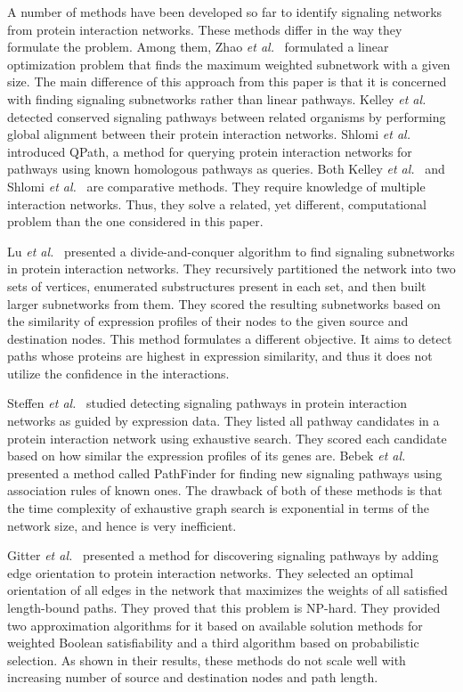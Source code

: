 \documentclass{ws-procs11x85}
\begin{document}
{%

A number of methods have been developed so far to identify signaling
networks from protein interaction networks. These methods differ in
the way they formulate the problem. Among them, Zhao {\it et
  al.}~\cite{zhao} formulated a linear optimization problem that finds
the maximum weighted subnetwork with a given size. The main difference
of this approach from this paper is that it is concerned with finding
signaling subnetworks rather than linear pathways.  Kelley {\it et
  al.}~\cite{kelley} detected conserved signaling pathways between
related organisms by performing global alignment between their protein
interaction networks.  Shlomi {\it et al.}~\cite{shlomi} introduced
QPath, a method for querying protein interaction networks for pathways
using known homologous pathways as queries.  Both Kelley {\it et
  al.}~\cite{kelley} and Shlomi {\it et al.}~\cite{shlomi} are
comparative methods.  They require knowledge of multiple interaction
networks. Thus, they solve a related, yet different, computational
problem than the one considered in this paper.

Lu {\it et al.}~\cite{lu} presented a divide-and-conquer algorithm to
find signaling subnetworks in protein interaction networks. They
recursively partitioned the network into two sets of vertices,
enumerated substructures present in each set, and then built larger
subnetworks from them.  They scored the resulting subnetworks based on
the similarity of expression profiles of their nodes to the given
source and destination nodes. This method formulates a different
objective. It aims to detect paths whose proteins are highest in
expression similarity, and thus it does not utilize the confidence in
the interactions.

Steffen {\it et al.}~\cite{steffen} studied detecting signaling
pathways in protein interaction networks as guided by expression data.
They listed all pathway candidates in a protein interaction network
using exhaustive search. They scored each candidate based on how
similar the expression profiles of its genes are. Bebek {\it et
  al.}~\cite{bebek} presented a method called PathFinder for finding
new signaling pathways using association rules of known ones.  The
drawback of both of these methods is that the time complexity of
exhaustive graph search is exponential in terms of the network size,
and hence is very inefficient.

Gitter {\it et al.}~\cite{gitter} presented a method for discovering
signaling pathways by adding edge orientation to protein interaction
networks. They selected an optimal orientation of all edges in the
network that maximizes the weights of all satisfied length-bound
paths.  They proved that this problem is NP-hard. They provided two
approximation algorithms for it based on available solution methods
for weighted Boolean satisfiability and a third algorithm based on
probabilistic selection. As shown in their results, these methods do
not scale well with increasing number of source and destination nodes
and path length.

}
\end{document}
